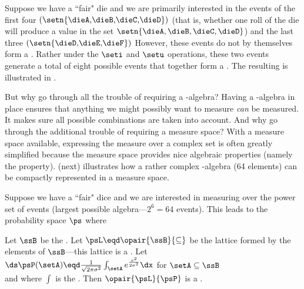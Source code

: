 \begin{example}
\label{ex:die_first4}
Suppose we have a ``fair" die and we are primarily interested in the
events of the first four
$\left(\setn{\text{\dieA,\dieB,\dieC,\dieD}}\right)$
(that is, whether one roll of the die will produce
a value in the set $\setn{\dieA,\dieB,\dieC,\dieD}$)
and the last three
$\left(\setn{\text{\dieD,\dieE,\dieF}}\right)$
However, these events do not by themselves form a .
Rather under the $\seti$ and $\setu$ operations, these two events generate
a total of eight possible events that together form a .
The resulting  is illustrated in .
\end{example}

But why go through all the trouble of requiring a \txsigma-algebra?
Having a \txsigma-algebra in place ensures that anything we might possibly 
want to measure {\em can} be measured.
It makes sure all possible combinations are taken into account.
And why go through the additional trouble of requiring a measure space?
With a measure space available, expressing the measure over a complex
set is often greatly simplified because the measure space provides nice 
algebraic properties (namely the  property).
 (next) illustrates how a rather complex
\txsigma-algebra (64 elements) can be compactly represented in a measure space.
\begin{example}
\label{ex:prob_123456}
Suppose we have a ``fair" dice and we are interested in measuring over the
power set of events (largest possible algebra---$2^6=64$ events).
This leads to the probability space $\ps$ where
\end{example}

\begin{example}
Let $\ssB$ be the .
Let $\psL\eqd\opair{\ssB}{\subseteq}$ be the lattice formed by the elements of $\ssB$---this
lattice is a .
Let 
\\\indentx$\ds\psP(\setA)\eqd\frac{1}{\sqrt{2\pi\sigma^2}}\int_\setA e^{\frac{x^2}{2\sigma^2}}\dx$ for $\setA\subseteq\ssB$\\
and where $\int$ is the  .
Then $\opair{\psL}{\psP}$ is a . 
\end{example}

